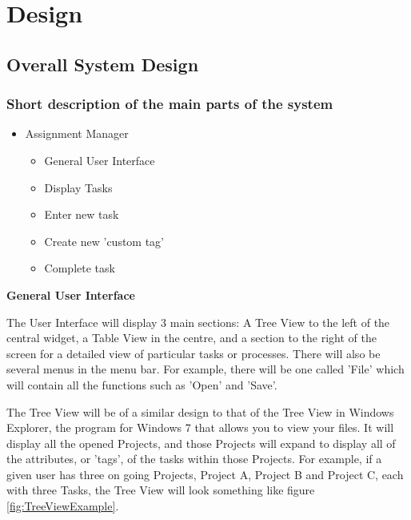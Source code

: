 \chapter{Design}

\section{Overall System Design}

\subsection{Short description of the main parts of the system} 

\begin{itemize}
	\item Assignment Manager
	\begin{itemize}
		\item General User Interface
		\item Display Tasks
		\item Enter new task
		\item Create new 'custom tag'
		\item Complete task
	\end{itemize}
\end{itemize}

\textbf{General User Interface}

The User Interface will display 3 main sections: A Tree View to the left of the central widget, a Table View in the centre, and a section to the right of the screen for a detailed view of particular tasks or processes. There will also be several menus in the menu bar. For example, there will be one called 'File' which will contain all the functions such as 'Open' and 'Save'.

The Tree View will be of a similar design to that of the Tree View in Windows Explorer, the program for Windows 7 that allows you to view your files. It will display all the opened Projects, and those Projects will expand to display all of the attributes, or 'tags', of the tasks within those Projects. For example, if a given user has three on going Projects, Project A, Project B and Project C, each with three Tasks, the Tree View will look something like figure \ref{fig:TreeViewExample}.

